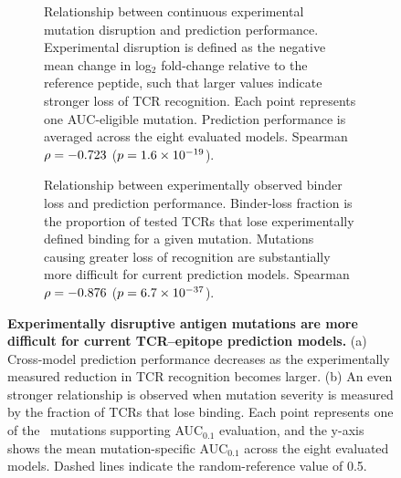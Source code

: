 \documentclass{article}
\begin{document}
\begin{figure}[!t]
\centering


\begin{subfigure}[t]{0.48\textwidth}
\centering

%

\caption{
Relationship between continuous experimental mutation disruption and
prediction performance. Experimental disruption is defined as the negative
mean change in log$_2$ fold-change relative to the reference peptide, such
that larger values indicate stronger loss of TCR recognition. Each point
represents one AUC-eligible mutation. Prediction performance is averaged
across the eight evaluated models. Spearman $\rho=-0.723$
($p=1.6\times10^{-19}$).
}
\label{fig:severity_disruption}
\end{subfigure}%
\hfill%
\begin{subfigure}[t]{0.48\textwidth}
\centering

%

\caption{
Relationship between experimentally observed binder loss and prediction
performance. Binder-loss fraction is the proportion of tested TCRs that
lose experimentally defined binding for a given mutation. Mutations causing
greater loss of recognition are substantially more difficult for current
prediction models. Spearman $\rho=-0.876$
($p=6.7\times10^{-37}$).
}
\label{fig:severity_binderloss}
\end{subfigure}

\caption{
\textbf{Experimentally disruptive antigen mutations are more difficult
for current TCR--epitope prediction models.}
(a) Cross-model prediction performance decreases as the experimentally
measured reduction in TCR recognition becomes larger.
(b) An even stronger relationship is observed when mutation severity is
measured by the fraction of TCRs that lose binding. Each point represents
one of the \valNeligible\ mutations supporting AUC$_{0.1}$ evaluation, and the
y-axis shows the mean mutation-specific AUC$_{0.1}$ across the eight
evaluated models. Dashed lines indicate the random-reference value of 0.5.
}
\label{fig:severity_vs_prediction}
\end{figure}
\end{document}
